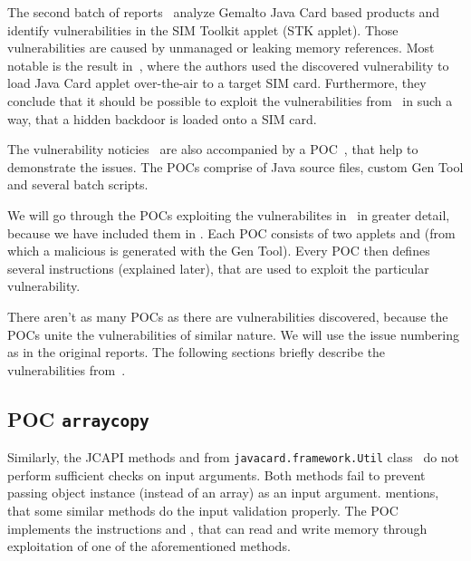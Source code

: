 The second batch of reports~\cite{se:gemalto:part1, se:gemalto:part2} analyze Gemalto Java Card based products and identify vulnerabilities in the SIM Toolkit applet (STK applet). Those vulnerabilities are caused by unmanaged or leaking memory references. Most notable is the result in~\cite{se:gemalto:part2}, where the authors used the discovered vulnerability to load Java Card applet over-the-air to a target SIM card. Furthermore, they conclude that it should be possible to exploit the vulnerabilities from~\cite{se:gemalto:part1, se:gemalto:part2} in such a way, that a hidden backdoor is loaded onto a SIM card.



    The vulnerability noticies~\cite{se:oracle:part1, se:oracle:part2, se:oracle:part3} are also accompanied by a POC~\cite{se:downloadpage}, that help to demonstrate the issues. The POCs comprise of Java source files, custom Gen Tool and several batch scripts.


We will go through the POCs exploiting the vulnerabilites in~\cite{se:oracle:part1, se:oracle:part2, se:oracle:part3} in greater detail, because we have included them in \projectname. Each POC consists of two applets \appletscap and \vulnscaporig (from which a malicious \vulnscap is generated with the Gen Tool). Every POC then defines several instructions (explained later), that are used to exploit the particular vulnerability.

There aren't as many POCs as there are vulnerabilities discovered, because the POCs unite the vulnerabilities of similar nature. We will use the issue numbering as in the original reports. The following sections briefly describe the vulnerabilities from~\cite{se:oracle:part1}.

\subsection{POC \texttt{arraycopy}}\label{subsec:arraycopy-explanation}
Similarly, the JCAPI methods \arrayCopy and \arrayCopyNonAtomic from \texttt{javacard.framework.Util} class~\cite{jcspecs31download} do not perform sufficient checks on input arguments. Both methods fail to prevent passing object instance (instead of an array) as an input argument. \cite{se:oracle:part1} mentions, that some similar methods do the input validation properly. The POC implements the instructions \readmem and \writemem, that can read and write memory through exploitation of one of the aforementioned methods.

